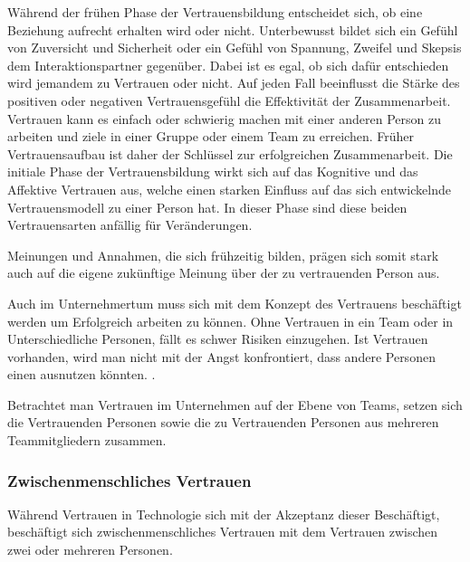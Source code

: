 \documentclass[a4paper,11pt]{article}%
\renewcommand{\\}{\vspace*{0.5\baselineskip} \newline}
\begin{document}
Während der frühen Phase der Vertrauensbildung entscheidet sich, ob eine Beziehung aufrecht erhalten wird oder nicht. Unterbewusst bildet sich ein Gefühl von Zuversicht und Sicherheit oder ein Gefühl von Spannung, Zweifel und Skepsis dem Interaktionspartner gegenüber. 
Dabei ist es egal, ob sich dafür entschieden wird jemandem zu Vertrauen oder nicht. Auf jeden Fall beeinflusst die Stärke des positiven oder negativen Vertrauensgefühl die Effektivität der Zusammenarbeit. Vertrauen kann es einfach oder schwierig machen mit einer anderen Person zu arbeiten und ziele in einer Gruppe oder einem Team zu erreichen.
Früher Vertrauensaufbau ist daher der Schlüssel zur erfolgreichen Zusammenarbeit. \citep[p.405-406]{bigley1998straining}
Die initiale Phase der Vertrauensbildung wirkt sich auf das Kognitive und das Affektive Vertrauen aus, welche einen starken Einfluss auf das sich entwickelnde Vertrauensmodell zu einer Person hat. In dieser Phase sind diese beiden Vertrauensarten anfällig für Veränderungen. \citep[p.461-462]{baldwin1992relational}

Meinungen und Annahmen, die sich frühzeitig bilden, prägen sich somit stark auch auf die eigene zukünftige Meinung über der zu vertrauenden Person aus.

Auch im Unternehmertum muss sich mit dem Konzept des Vertrauens beschäftigt werden um Erfolgreich arbeiten zu können. Ohne Vertrauen in ein Team oder in Unterschiedliche Personen, fällt es schwer Risiken einzugehen. Ist Vertrauen vorhanden, wird man nicht mit der Angst konfrontiert, dass andere Personen einen ausnutzen könnten. \citep[p.1152]{breuer2016does}.

Betrachtet man Vertrauen im Unternehmen auf der Ebene von Teams, setzen sich die Vertrauenden Personen sowie die zu Vertrauenden Personen aus mehreren Teammitgliedern zusammen.
 

		\subsubsection{Zwischenmenschliches Vertrauen}
Während Vertrauen in Technologie sich mit der Akzeptanz dieser Beschäftigt, beschäftigt sich zwischenmenschliches Vertrauen mit dem Vertrauen zwischen zwei oder mehreren Personen. \citep{mcknight2011trust}
\end{document}

